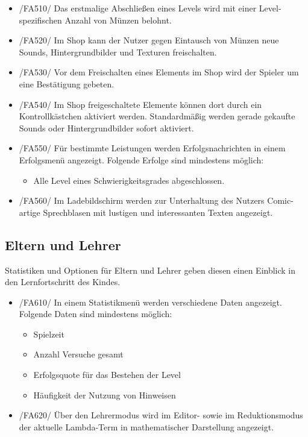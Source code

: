 \begin{itemize}
\item /FA510/ Das erstmalige Abschließen eines Levels wird mit einer Level-spezifischen Anzahl von Münzen belohnt.
\item /FA520/ Im Shop kann der Nutzer gegen Eintausch von Münzen neue Sounds, Hintergrundbilder und Texturen freischalten.
\item /FA530/ Vor dem Freischalten eines Elements im Shop wird der Spieler um eine Bestätigung gebeten.
\item /FA540/ Im Shop freigeschaltete Elemente können dort durch ein Kontrollkästchen aktiviert werden. Standardmäßig werden gerade gekaufte Sounds oder Hintergrundbilder sofort aktiviert.
\item /FA550/ Für bestimmte Leistungen werden Erfolgsnachrichten in einem Erfolgsmenü angezeigt. Folgende Erfolge sind mindestens möglich:
\begin{itemize}
\item Alle Level eines Schwierigkeitsgrades abgeschlossen.
\end{itemize}
\item /FA560/ Im Ladebildschirm werden zur Unterhaltung des Nutzers Comic-artige Sprechblasen mit lustigen und interessanten Texten angezeigt.
\end{itemize}

\subsection{Eltern und Lehrer}

Statistiken und Optionen für Eltern und Lehrer geben diesen einen Einblick in den Lernfortschritt des Kindes.

\begin{itemize}
\item /FA610/ In einem Statistikmenü werden verschiedene Daten angezeigt. Folgende Daten sind mindestens möglich:
\begin{itemize}
\item Spielzeit
\item Anzahl Versuche gesamt
\item Erfolgsquote für das Bestehen der Level
\item Häufigkeit der Nutzung von Hinweisen
\end{itemize}
\item /FA620/ Über den Lehrermodus wird im Editor- sowie im Reduktionsmodus der aktuelle Lambda-Term in mathematischer Darstellung angezeigt.
\end{itemize}

